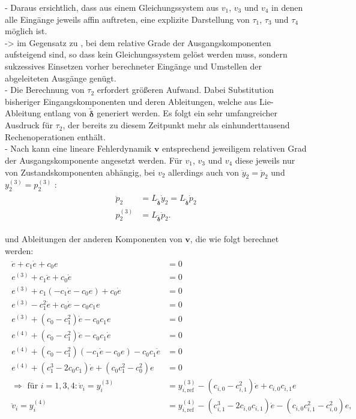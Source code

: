 - Daraus ersichtlich, dass aus einem Gleichungssystem aus $v_1$, $v_3$ und $v_4$ in denen alle Eingänge jeweils affin auftreten, eine explizite Darstellung von $\tau_1$, $\tau_3$ und $\tau_4$ möglich ist. \\
-> im Gegensatz zu \cite[S. 207]{NLRT_Roebenack}, bei dem relative Grade der Ausgangskomponenten aufsteigend sind, so dass kein Gleichungssystem gelöst werden muss, sondern sukzessives Einsetzen vorher berechneter Eingänge und Umstellen der abgeleiteten Ausgänge genügt.\\
- Die Berechnung von $\tau_2$ erfordert größeren Aufwand. Dabei Substitution bisheriger Eingangskomponenten und deren Ableitungen, welche aus Lie-Ableitung entlang von $\mathbf{\tilde{\delta}}$ generiert werden. Es folgt ein sehr umfangreicher Ausdruck für $\tau_2$, der bereits zu diesem Zeitpunkt mehr als einhunderttausend Rechenoperationen enthält. \\
- Nach \cite[S. 208]{NLRT_Roebenack} kann eine lineare Fehlerdynamik $\mathbf{v}$ entsprechend jeweiligem relativen Grad der Ausgangskomponente angesetzt werden. Für $v_1$, $v_3$ und $v_4$ diese jeweils nur von Zustandskomponenten abhängig, bei $v_2$ allerdings auch von $\ddot{y}_2 = \ddot{p}_2$ und $y_2^{(3)} = p_2^{(3)}$ :
\begin{align}
	\begin{split}
		\ddot{p}_2 &= L_{\mathbf{\tilde{\delta}}} \dot{y}_2 = L_{\mathbf{\tilde{\delta}}} \dot{p}_2 \\
		p_2^{(3)} &= L_{\mathbf{\tilde{\delta}}} \ddot{p}_2.
	\end{split}
\end{align}

und Ableitungen der anderen Komponenten von $\mathbf{v}$, die wie folgt berechnet werden:
\begin{align}
	\begin{split}
	    \ddot{e} + c_1 \dot{e} + c_0 e &= 0 \\
		e^{(3)} + c_1 \ddot{e} + c_0 \dot{e} &= 0 \\
		e^{(3)} + c_1 (-c_1 \dot{e} - c_0 e) + c_0 \dot{e} &= 0 \\
		e^{(3)} - c_1^2 \dot{e} + c_0 \dot{e} - c_0 c_1 e &= 0 \\
		e^{(3)} + (c_0 - c_1^2) \dot{e} - c_0 c_1 e &= 0 \\
		e^{(4)} + (c_0 - c_1^2) \ddot{e} - c_0 c_1 \dot{e} &= 0 \\
		e^{(4)} + (c_0 - c_1^2) (-c_1 \dot{e} - c_0 e) - c_0 c_1 \dot{e} &= 0 \\
		e^{(4)} + (c_1^3 - 2 c_0 c_1) \dot{e} + (c_0 c_1^2 - c_0^2) e &= 0 \\
		\Rightarrow \text{ für } i = 1,3,4: \dot{v}_i = y_i^{(3)} &= y_{i, \text{ref}}^{(3)} - (c_{i, 0} - c_{i, 1}^2) \dot{e} + c_{i, 0} c_{i, 1} e \\
		\ddot{v}_i = y_i^{(4)} &= y_{i, \text{ref}}^{(4)} - (c_{i, 1}^3 - 2 c_{i, 0} c_{i, 1}) \dot{e} - (c_{i, 0} c_{i, 1}^2 - c_{i, 0}^2) e,
	\end{split}
\end{align}

